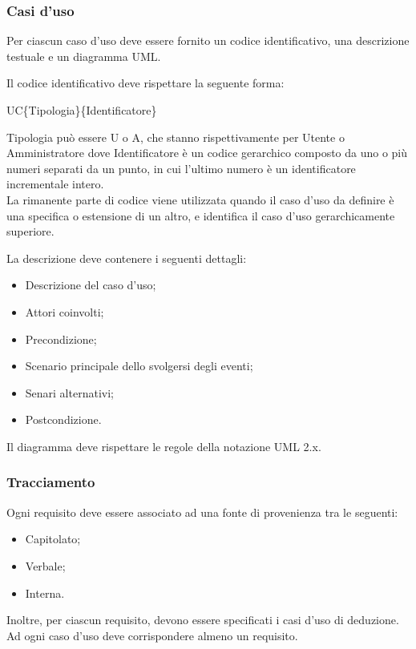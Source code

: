 \subsubsection{Casi d'uso}
Per ciascun caso d'uso deve essere fornito un codice identificativo, una descrizione testuale e un diagramma UML.

\begin{flushleft}
Il codice identificativo deve rispettare la seguente forma:
\end{flushleft}

\begin{center}UC\{Tipologia\}\{Identificatore\}\end{center}
Tipologia può essere U o A, che stanno rispettivamente per Utente o Amministratore
dove Identificatore è un codice gerarchico composto da uno o più numeri separati da un punto, in cui l'ultimo numero è un identificatore incrementale intero.\\
La rimanente parte di codice viene utilizzata quando il caso d'uso da definire è una specifica o estensione di un altro, e identifica il caso d'uso gerarchicamente superiore.

\begin{flushleft}
La descrizione deve contenere i seguenti dettagli:
\end{flushleft}

\begin{itemize}
\item Descrizione del caso d'uso;
\item Attori coinvolti;
\item Precondizione;
\item Scenario principale dello svolgersi degli eventi;
\item Senari alternativi;
\item Postcondizione.
\end{itemize}

\begin{flushleft}
Il diagramma deve rispettare le regole della notazione UML 2.x.
\end{flushleft}

\subsubsection{Tracciamento}
Ogni requisito deve essere associato ad una fonte di provenienza tra le seguenti:

\begin{itemize}
\item Capitolato;
\item Verbale;
\item Interna.
\end{itemize}
Inoltre, per ciascun requisito, devono essere specificati i casi d'uso di deduzione.\\
Ad ogni caso d'uso deve corrispondere almeno un requisito.

